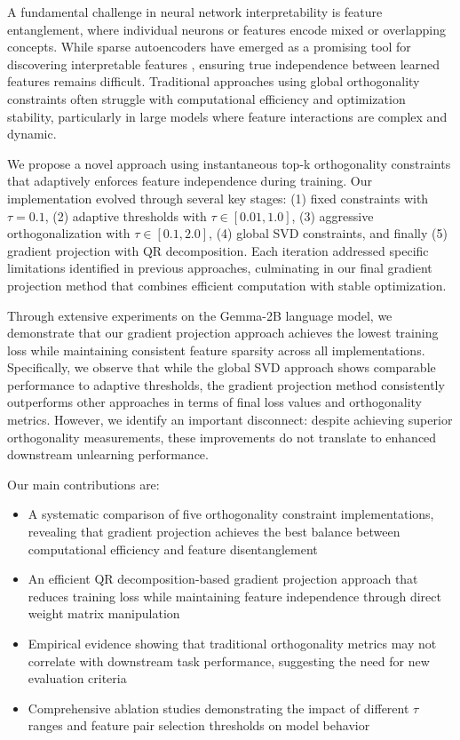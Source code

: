 \documentclass{article} %
\begin{document}
A fundamental challenge in neural network interpretability is feature entanglement, where individual neurons or features encode mixed or overlapping concepts. While sparse autoencoders have emerged as a promising tool for discovering interpretable features \cite{karpathy2023nanogpt}, ensuring true independence between learned features remains difficult. Traditional approaches using global orthogonality constraints often struggle with computational efficiency and optimization stability, particularly in large models where feature interactions are complex and dynamic.

We propose a novel approach using instantaneous top-k orthogonality constraints that adaptively enforces feature independence during training. Our implementation evolved through several key stages: (1) fixed constraints with $\tau = 0.1$, (2) adaptive thresholds with $\tau \in [0.01, 1.0]$, (3) aggressive orthogonalization with $\tau \in [0.1, 2.0]$, (4) global SVD constraints, and finally (5) gradient projection with QR decomposition. Each iteration addressed specific limitations identified in previous approaches, culminating in our final gradient projection method that combines efficient computation with stable optimization.

Through extensive experiments on the Gemma-2B language model, we demonstrate that our gradient projection approach achieves the lowest training loss while maintaining consistent feature sparsity across all implementations. Specifically, we observe that while the global SVD approach shows comparable performance to adaptive thresholds, the gradient projection method consistently outperforms other approaches in terms of final loss values and orthogonality metrics. However, we identify an important disconnect: despite achieving superior orthogonality measurements, these improvements do not translate to enhanced downstream unlearning performance.

Our main contributions are:
\begin{itemize}
    \item A systematic comparison of five orthogonality constraint implementations, revealing that gradient projection achieves the best balance between computational efficiency and feature disentanglement
    \item An efficient QR decomposition-based gradient projection approach that reduces training loss while maintaining feature independence through direct weight matrix manipulation
    \item Empirical evidence showing that traditional orthogonality metrics may not correlate with downstream task performance, suggesting the need for new evaluation criteria
    \item Comprehensive ablation studies demonstrating the impact of different $\tau$ ranges and feature pair selection thresholds on model behavior
\end{itemize}
\end{document}
